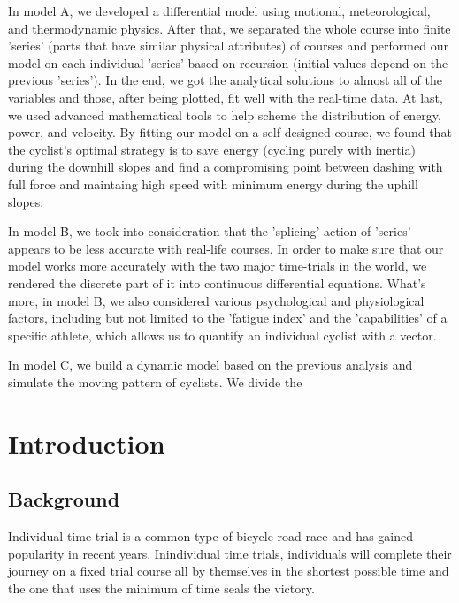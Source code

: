 \documentclass[12pt]{article}
\theoremstyle{definition}
\theoremstyle{remark}
\numberwithin{equation}{section}
\begin{document}
	In model A, we developed a differential model using motional, meteorological, and thermodynamic physics. After that, we separated the whole course into finite 'series' (parts that have similar physical attributes) of courses and performed our model on each individual 'series' based on recursion (initial values depend on the previous 'series'). In the end, we got the analytical solutions to almost all of the variables and those, after being plotted, fit well with the real-time data. At last, we used advanced mathematical tools to help scheme the distribution of energy, power, and velocity. By fitting our model on a self-designed course, we found that the cyclist's optimal strategy is to save energy (cycling purely with inertia) during the downhill slopes and find a compromising point between dashing with full force and maintaing high speed with minimum energy during the uphill slopes.

	In model B, we took into consideration that the 'splicing' action of 'series' appears to be less accurate with real-life courses. In order to make sure that our model works more accurately with the two major time-trials in the world, we rendered the discrete part of it into continuous differential equations. What's more, in model B, we also considered various psychological and physiological factors, including but not limited to the 'fatigue index' and the 'capabilities' of a specific athlete, which allows us to quantify an individual cyclist with a vector.

	In model C, we build a dynamic model based on the previous analysis and simulate the moving pattern of cyclists. We divide the 

	
	\newpage
	\clearpage
	\thispagestyle{empty}
	\tableofcontents %
	\newpage
	\pagestyle{fancy}
	\setcounter{page}{1}
	
	\newpage
	\section{Introduction}
	\subsection{Background}
	Individual time trial is a common type of bicycle road race and has gained popularity in recent years. Inindividual time trials, individuals will complete their journey on a fixed trial course all by themselves in the shortest possible time and the one that uses the minimum of time seals the victory.
\end{document}
